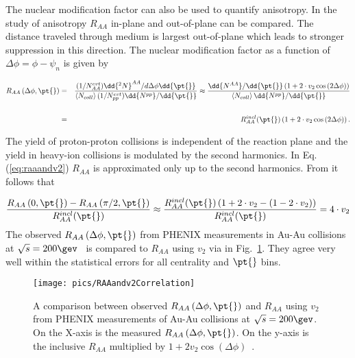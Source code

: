 The nuclear modification factor can also be used to quantify anisotropy. In the study of anisotropy $R_{AA}$ in-plane and out-of-plane can be compared. The distance traveled through medium is largest out-of-plane which leads to stronger suppression in this direction. The nuclear modification factor as a function of $\Delta\phi=\phi-\psi_n$ is given by

\begin{eqnarray}
R_{AA}\left(\Delta\phi, \pt{}\right) &=& \frac{(1/N_{AA}^{evt})\dd {^2N}^{AA}/d\Delta\phi \dd {\pt{}}}{\left< N_{coll}\right> (1/N_{pp}^{evt})\dd {N^{pp}}/\dd {\pt{}}} \approx \frac{\dd {N^{AA}}/\dd {\pt{}}\left( 1+2\cdot v_2\cos{(2\Delta\phi)} \right)}{\left< N_{coll}\right> \dd {N^{pp}}/\dd {\pt{}}} \nonumber \\ &&\nonumber\\
&=& R_{AA}^{incl}(\pt{}) \left( 1+2\cdot v_2\cos{(2\Delta\phi)} \right).
\label{eq:raaandv2}
\end{eqnarray}	

The yield of proton-proton collisions is independent of the reaction plane and the yield in heavy-ion collisions is modulated by the second harmonics. In Eq. (\ref{eq:raaandv2}) $R_{AA}$ is approximated only up to the second harmonics.
From  it follows that

\begin{equation}
\frac{R_{AA}\left(0, \pt{}\right)-R_{AA}\left(\pi/2, \pt{}\right)}{R_{AA}^{incl}(\pt{})} \approx \frac{R_{AA}^{incl}(\pt{}) \left(1+2 \cdot v_2-(1-2 \cdot v_2) \right)}{R_{AA}^{incl}(\pt{})} = 4 \cdot v_2
\label{eq:raaandv2result}
\end{equation} 
The observed $R_{AA}\left(\Delta\phi, \pt{}\right)$  from PHENIX measurements in Au-Au collisions at $\sqrt{s}=200\gev$~\cite{PhysRevC.80.054907} is compared to $R_{AA}$ using $v_2$  via  in Fig.~\ref{fig:RAAv2}. They agree very well within the statistical errors for all centrality and $\pt{}$ bins.
\begin{figure}[htb]
	\centering
                \texttt{[image: pics/RAAandv2Correlation]}
        \caption[A comparison between observed $R_{AA}\left(\Delta\phi, \pt{}\right) $ and $R_{AA}$ using $v_2$]{ A comparison between observed $R_{AA}\left(\Delta\phi, \pt{}\right) $ and $R_{AA}$ using $v_2$ from PHENIX measurements of Au-Au collisions at $\sqrt{s}=200\gev$. On the X-axis is the measured $R_{AA}\left(\Delta\phi,\pt{}\right)$. On the y-axis is the inclusive $R_{AA}$ multiplied by  $1+2v_2\cos\left(\Delta\phi\right)$~\cite{PhysRevC.80.054907}.}
        \label{fig:RAAv2}
\end{figure}

